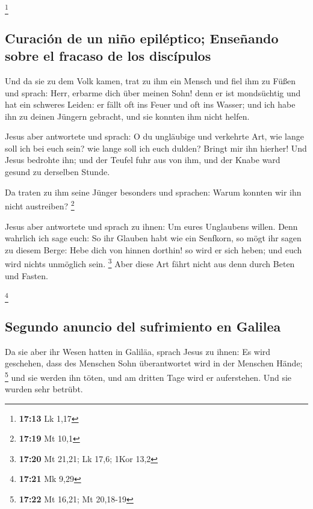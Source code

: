 \footnote{\textbf{17:13} Lk 1,17}

\hypertarget{curaciuxf3n-de-un-niuxf1o-epiluxe9ptico-enseuxf1ando-sobre-el-fracaso-de-los-discuxedpulos}{%
\subsection{Curación de un niño epiléptico; Enseñando sobre el fracaso
de los
discípulos}\label{curaciuxf3n-de-un-niuxf1o-epiluxe9ptico-enseuxf1ando-sobre-el-fracaso-de-los-discuxedpulos}}

 Und da sie zu dem Volk kamen, trat zu ihm ein Mensch und
fiel ihm zu Füßen  und sprach: Herr, erbarme dich über
meinen Sohn! denn er ist mondsüchtig und hat ein schweres Leiden: er
fällt oft ins Feuer und oft ins Wasser;  und ich habe ihn
zu deinen Jüngern gebracht, und sie konnten ihm nicht helfen.

 Jesus aber antwortete und sprach: O du ungläubige und
verkehrte Art, wie lange soll ich bei euch sein? wie lange soll ich euch
dulden? Bringt mir ihn hierher!  Und Jesus bedrohte ihn;
und der Teufel fuhr aus von ihm, und der Knabe ward gesund zu derselben
Stunde.

 Da traten zu ihm seine Jünger besonders und sprachen:
Warum konnten wir ihn nicht austreiben? \footnote{\textbf{17:19} Mt 10,1}

 Jesus aber antwortete und sprach zu ihnen: Um eures
Unglaubens willen. Denn wahrlich ich sage euch: So ihr Glauben habt wie
ein Senfkorn, so mögt ihr sagen zu diesem Berge: Hebe dich von hinnen
dorthin! so wird er sich heben; und euch wird nichts unmöglich sein.
\footnote{\textbf{17:20} Mt 21,21; Lk 17,6; 1Kor 13,2} 
Aber diese Art fährt nicht aus denn durch Beten und Fasten.

\footnote{\textbf{17:21} Mk 9,29}

\hypertarget{segundo-anuncio-del-sufrimiento-en-galilea}{%
\subsection{Segundo anuncio del sufrimiento en
Galilea}\label{segundo-anuncio-del-sufrimiento-en-galilea}}

 Da sie aber ihr Wesen hatten in Galiläa, sprach Jesus zu
ihnen: Es wird geschehen, dass des Menschen Sohn überantwortet wird in
der Menschen Hände; \footnote{\textbf{17:22} Mt 16,21; Mt 20,18-19}
 und sie werden ihn töten, und am dritten Tage wird er
auferstehen. Und sie wurden sehr betrübt.

